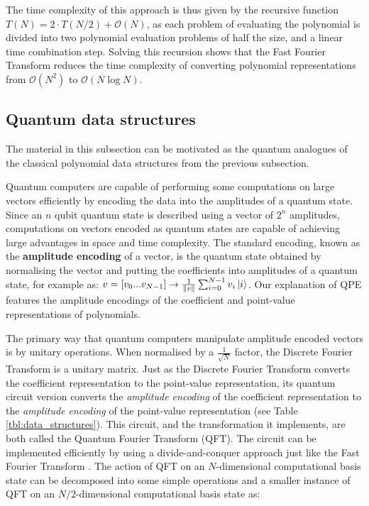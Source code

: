 \documentclass[prb,preprint]{revtex4}
\begin{document}
	The time complexity of this approach is thus given by the recursive function $T(N) = 2\cdot T(N/2) + \mathcal{O}(N)$, as each problem of evaluating the polynomial is divided into two polynomial evaluation problems of half the size, and a linear time combination step. Solving this recursion \cite{bentley1980general} shows that the Fast Fourier Transform reduces the time complexity of converting polynomial representations from $\mathcal{O}(N^2)$ to $\mathcal{O}(N\log N)$.
		
	
	\subsection{Quantum data structures}
	
	The material in this subsection can be motivated as the quantum analogues of the classical polynomial data structures from the previous subsection.
	
	Quantum computers are capable of performing some computations on large vectors efficiently by encoding the data into the amplitudes of a quantum state. Since an $n$ qubit quantum state is described using a vector of $2^n$ amplitudes, computations on vectors encoded as quantum states are capable of achieving large advantages in space and time complexity. The standard encoding, known as the \textbf{amplitude encoding} of a vector, is the quantum state obtained by normalising the vector and putting the coefficients into amplitudes of a quantum state, for example as: $v= [v_0 ... v_{N-1}] \rightarrow \frac{1}{\norm{v}} \sum_{i=0}^{N-1} v_i \ket{i}$. Our explanation of QPE features the amplitude encodings of the coefficient and point-value representations of polynomials.
	
	The primary way that quantum computers manipulate amplitude encoded vectors is by unitary operations. 
	When normalised by a $\frac{1}{\sqrt{N}}$ factor, the Discrete Fourier Transform is a unitary matrix. Just as the Discrete Fourier Transform converts the coefficient representation to the point-value representation, its quantum circuit version converts the \textit{amplitude encoding} of the coefficient representation to the \textit{amplitude encoding} of the point-value representation (see Table \ref{tbl:data_structures}). This circuit, and the transformation it implements, are both called the Quantum Fourier Transform (QFT). The circuit can be implemented efficiently by using a divide-and-conquer approach just like the Fast Fourier Transform \cite{paradisi2004presentation}. The action of QFT on an $N$-dimensional computational basis state can be decomposed into some simple operations and a smaller instance of QFT on an $N/2$-dimensional computational basis state as:
	
\end{document}
